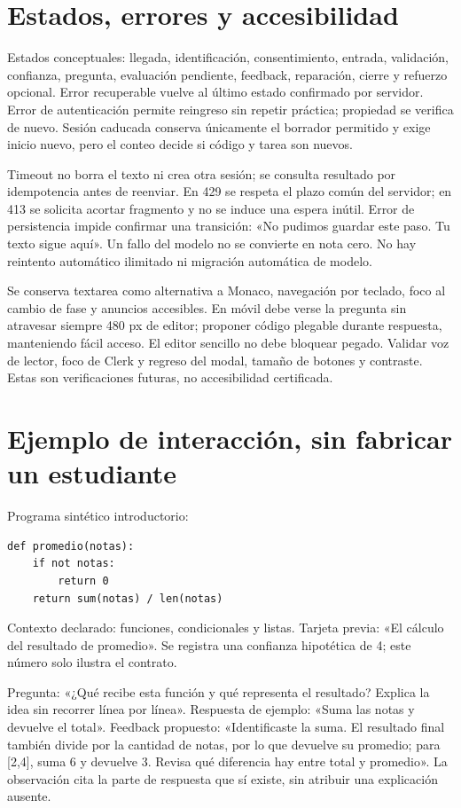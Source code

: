 \documentclass[11pt,a4paper]{report}
\begin{document}
\section{Estados, errores y accesibilidad}
Estados conceptuales: llegada, identificación, consentimiento, entrada, validación, confianza, pregunta, evaluación pendiente, feedback, reparación, cierre y refuerzo opcional. Error recuperable vuelve al último estado confirmado por servidor. Error de autenticación permite reingreso sin repetir práctica; propiedad se verifica de nuevo. Sesión caducada conserva únicamente el borrador permitido y exige inicio nuevo, pero el conteo decide si código y tarea son nuevos.

Timeout no borra el texto ni crea otra sesión; se consulta resultado por idempotencia antes de reenviar. En 429 se respeta el plazo común del servidor; en 413 se solicita acortar fragmento y no se induce una espera inútil. Error de persistencia impide confirmar una transición: «No pudimos guardar este paso. Tu texto sigue aquí». Un fallo del modelo no se convierte en nota cero. No hay reintento automático ilimitado ni migración automática de modelo.

Se conserva textarea como alternativa a Monaco, navegación por teclado, foco al cambio de fase y anuncios accesibles. En móvil debe verse la pregunta sin atravesar siempre 480 px de editor; proponer código plegable durante respuesta, manteniendo fácil acceso. El editor sencillo no debe bloquear pegado. Validar voz de lector, foco de Clerk y regreso del modal, tamaño de botones y contraste. Estas son verificaciones futuras, no accesibilidad certificada.

\section{Ejemplo de interacción, sin fabricar un estudiante}
Programa sintético introductorio:
\begin{verbatim}
def promedio(notas):
    if not notas:
        return 0
    return sum(notas) / len(notas)
\end{verbatim}
Contexto declarado: funciones, condicionales y listas. Tarjeta previa: «El cálculo del resultado de promedio». Se registra una confianza hipotética de 4; este número solo ilustra el contrato.

Pregunta: «¿Qué recibe esta función y qué representa el resultado? Explica la idea sin recorrer línea por línea». Respuesta de ejemplo: «Suma las notas y devuelve el total». Feedback propuesto: «Identificaste la suma. El resultado final también divide por la cantidad de notas, por lo que devuelve su promedio; para [2,4], suma 6 y devuelve 3. Revisa qué diferencia hay entre total y promedio». La observación cita la parte de respuesta que sí existe, sin atribuir una explicación ausente.
\end{document}
